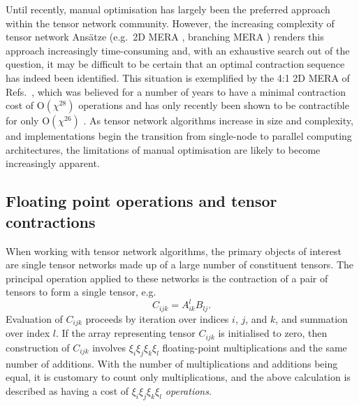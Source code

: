 \documentclass[aps,pre,reprint,superscriptaddress,amsfonts,amsmath,showpacs,nofootinbib,floatfix]{revtex4-1}
\newcommand{\mrm}[1]{\mathrm{#1}}
\newcommand{\OO}[1]{\mrm{O}(#1)}
\begin{document}
Until recently, manual optimisation has largely been the preferred approach within the tensor network community. However, the increasing complexity of tensor network Ans\"atze (e.g.~2D MERA \cite{cincio2008,evenbly2009,evenbly2009b}, %
branching MERA \cite{evenbly2011}) renders this approach increasingly time-consuming and, with an exhaustive search out of the question, it may be difficult to be certain that an optimal contraction sequence has indeed been identified. This situation is exemplified by the 4:1 2D MERA of Refs.~, which was believed for a number of years to have a minimal contraction cost of $\OO{\chi^{28}}$ operations and has only recently been shown to be contractible for only $\OO{\chi^{26}}$ \cite{pfeifer2013}. As tensor network algorithms increase in size and complexity, and implementations begin the transition from single-node to parallel computing architectures, the limitations of manual optimisation are likely to become increasingly apparent.









\subsection{Floating point operations and tensor contractions\label{sec:flops}}


When working with tensor network algorithms, the primary objects of interest are single tensor networks made up of a large number of constituent tensors. The principal operation applied to these networks is the contraction of a pair of tensors to form a single tensor, e.g.
\begin{equation}
C_{ijk} = A_{ik}^l B_{lj}.
\end{equation}
Evaluation of $C_{ijk}$ proceeds by iteration over indices $i$, $j$, and $k$, and summation over index $l$. If the array representing tensor $C_{ijk}$ is initialised to zero, then construction of $C_{ijk}$ involves $\xi_i\xi_j\xi_k\xi_l$ floating-point multiplications and the same number of additions. With the number of multiplications and additions being equal, it is customary to count only multiplications, and the above calculation is described as having a cost of \emph{$\xi_i\xi_j\xi_k\xi_l$ operations}.
\end{document}
